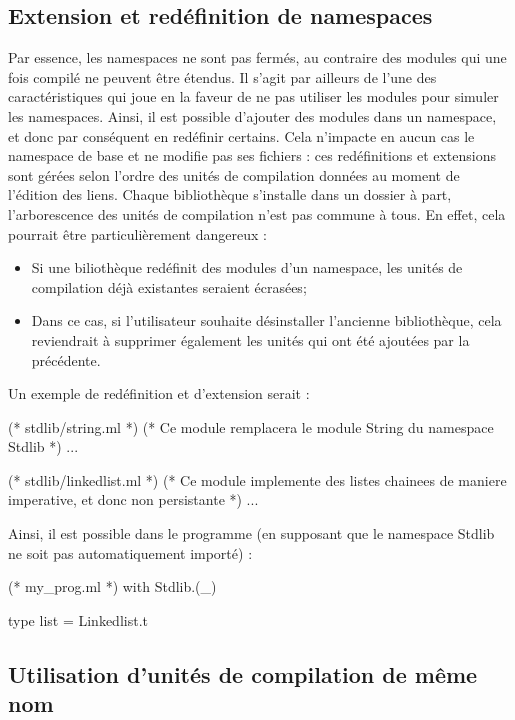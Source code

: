 \documentclass[11pt,a4paper]{report}
\begin{document}
\subsection{Extension et redéfinition de namespaces}

Par essence, les namespaces ne sont pas fermés, au contraire des modules qui
une fois compilé ne peuvent être étendus. Il s'agit par ailleurs de l'une des
caractéristiques qui joue en la faveur de ne pas utiliser les modules pour
simuler les namespaces. Ainsi, il est possible d'ajouter des modules dans un
namespace, et donc par conséquent en redéfinir certains. Cela n'impacte en aucun
cas le namespace de base et ne modifie pas ses fichiers : ces redéfinitions et
extensions sont gérées selon l'ordre des unités de compilation données au moment
de l'édition des liens. Chaque bibliothèque s'installe dans un dossier à part,
l'arborescence des unités de compilation n'est pas commune à tous. En effet,
cela pourrait être particulièrement dangereux :
\begin{itemize}
\item Si une biliothèque redéfinit des modules d'un namespace, les unités de
  compilation déjà existantes seraient écrasées;
\item Dans ce cas, si l'utilisateur souhaite désinstaller l'ancienne
  bibliothèque, cela reviendrait à supprimer également les unités qui ont été
  ajoutées par la précédente.
\end{itemize}

Un exemple de redéfinition et d'extension serait :
\begin{OCaml}
(* stdlib/string.ml *)
(* Ce module remplacera le module String du namespace Stdlib *)
...
\end{OCaml}

\begin{OCaml}
(* stdlib/linkedlist.ml *)
(* Ce module implemente des listes chainees de maniere imperative, et donc non
   persistante *)
...
\end{OCaml}

Ainsi, il est possible dans le programme (en supposant que le namespace Stdlib
ne soit pas automatiquement importé) :

\begin{OCaml}
(* my_prog.ml *)
with Stdlib.(_)

type list = Linkedlist.t
\end{OCaml}

\subsection{Utilisation d'unités de compilation de même nom}
\end{document}
